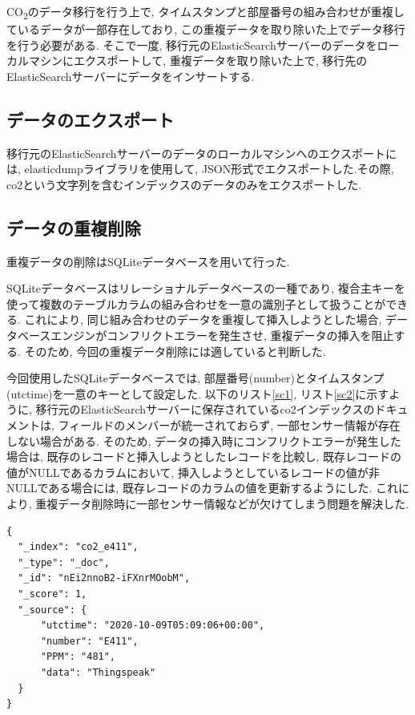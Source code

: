 CO\textsubscript{2}のデータ移行を行う上で, タイムスタンプと部屋番号の組み合わせが重複しているデータが一部存在しており, この重複データを取り除いた上でデータ移行を行う必要がある. そこで一度, 移行元のElasticSearchサーバーのデータをローカルマシンにエクスポートして, 重複データを取り除いた上で, 移行先のElasticSearchサーバーにデータをインサートする.

\subsection{データのエクスポート}
移行元のElasticSearchサーバーのデータのローカルマシンへのエクスポートには, elasticdumpライブラリを使用して, JSON形式でエクスポートした.その際, co2という文字列を含むインデックスのデータのみをエクスポートした.

\subsection{データの重複削除}
重複データの削除はSQLiteデータベースを用いて行った.

SQLiteデータベースはリレーショナルデータベースの一種であり, 複合主キーを使って複数のテーブルカラムの組み合わせを一意の識別子として扱うことができる. これにより, 同じ組み合わせのデータを重複して挿入しようとした場合, データベースエンジンがコンフリクトエラーを発生させ, 重複データの挿入を阻止する. そのため, 今回の重複データ削除には適していると判断した.

今回使用したSQLiteデータベースでは, 部屋番号(number)とタイムスタンプ(utctime)を一意のキーとして設定した. 以下のリスト\ref{sc1}, リスト\ref{sc2}に示すように, 移行元のElasticSearchサーバーに保存されているco2インデックスのドキュメントは, フィールドのメンバーが統一されておらず, 一部センサー情報が存在しない場合がある. そのため, データの挿入時にコンフリクトエラーが発生した場合は, 既存のレコードと挿入しようとしたレコードを比較し, 既存レコードの値がNULLであるカラムにおいて, 挿入しようとしているレコードの値が非NULLである場合には, 既存レコードのカラムの値を更新するようにした. これにより, 重複データ削除時に一部センサー情報などが欠けてしまう問題を解決した.

\begin{lstlisting}[caption=\_sourceフィールドのメンバー数が少ないドキュメント, label=sc1]
{
  "_index": "co2_e411",
  "_type": "_doc",
  "_id": "nEi2nnoB2-iFXnrMOobM",
  "_score": 1,
  "_source": {
      "utctime": "2020-10-09T05:09:06+00:00",
      "number": "E411",
      "PPM": "481",
      "data": "Thingspeak"
  }
}
  \end{lstlisting}

